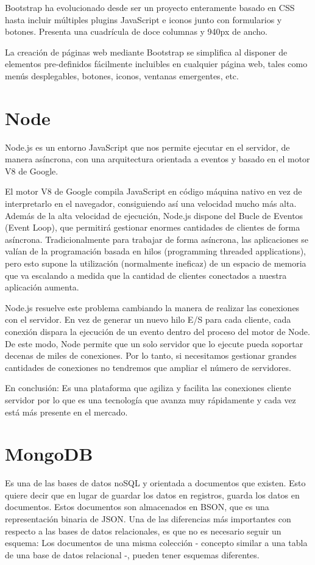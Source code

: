 \documentclass[a4paper, 12pt]{book}
\begin{document}
	Bootstrap ha evolucionado desde ser un proyecto enteramente basado en CSS hasta incluir múltiples plugins JavaScript e iconos junto con formularios y botones. Presenta una cuadrícula de doce columnas y 940px de ancho.

	La creación de páginas web mediante Bootstrap se simplifica al disponer de elementos pre-definidos fácilmente incluibles en cualquier página web, tales como menús desplegables, botones, iconos, ventanas emergentes, etc.

\section{Node} 
\label{sec:Node}
	Node.js es un entorno JavaScript que nos permite ejecutar en el servidor, de manera asíncrona, con una arquitectura orientada a eventos y basado en el motor V8 de Google.
	
	El motor V8 de Google compila JavaScript en código máquina nativo en vez de interpretarlo en el navegador, consiguiendo así una velocidad mucho más alta. Además de la alta velocidad de ejecución, Node.js dispone del Bucle de Eventos (Event Loop), que permitirá gestionar enormes cantidades de clientes de forma asíncrona. Tradicionalmente para trabajar de forma asíncrona, las aplicaciones se valían de la programación basada en hilos (programming threaded applications), pero esto supone la utilización (normalmente ineficaz) de un espacio de memoria que va escalando a medida que la cantidad de clientes conectados a nuestra aplicación aumenta.
	
	Node.js resuelve este problema cambiando la manera de realizar las conexiones con el servidor. En vez de generar un nuevo hilo E/S para cada cliente, cada conexión dispara la ejecución de un evento dentro del proceso del motor de Node. De este modo, Node permite que un solo servidor que lo ejecute pueda soportar decenas de miles de conexiones. Por lo tanto, si necesitamos gestionar grandes cantidades de conexiones no tendremos que ampliar el número de servidores.

	En conclusión: Es una plataforma que agiliza y facilita las conexiones cliente servidor por lo que es una tecnología que avanza muy rápidamente y cada vez está más presente en el mercado.

\section{MongoDB} 
\label{sec:MongoDB}

Es una de las bases de datos noSQL y orientada a documentos que existen. Esto quiere decir que en lugar de guardar los datos en registros, guarda los datos en documentos. Estos documentos son almacenados en BSON, que es una representación binaria de JSON. Una de las diferencias más importantes con respecto a las bases de datos relacionales, es que no es necesario seguir un esquema: Los documentos de una misma colección - concepto similar a una tabla de una base de datos relacional -, pueden tener esquemas diferentes.
\end{document}
